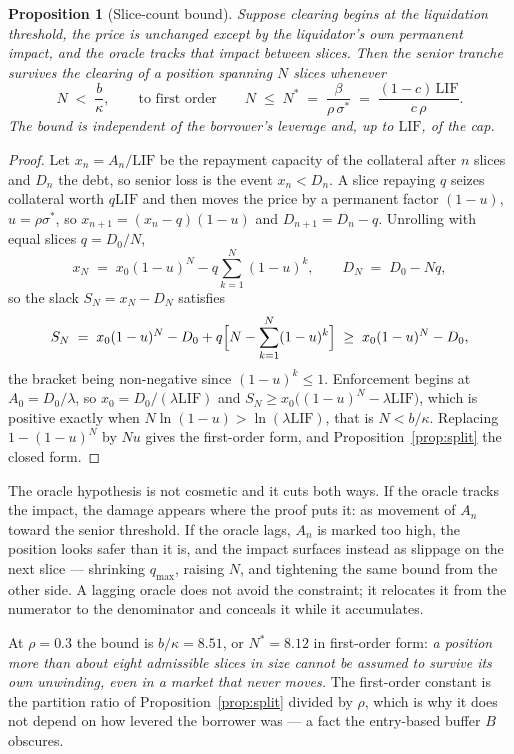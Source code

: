 \documentclass[11pt,a4paper]{article}
\theoremstyle{plain}
\newtheorem{proposition}{Proposition}
\theoremstyle{definition}
\theoremstyle{remark}
\newcommand{\LIF}{\mathrm{LIF}}
\begin{document}
\begin{proposition}[Slice-count bound]\label{prop:self}
Suppose clearing begins at the liquidation threshold, the price is unchanged except by the
liquidator's own permanent impact, and the oracle tracks that impact between slices. Then the
senior tranche survives the clearing of a position spanning $N$ slices whenever
\[
  N \;<\; \frac{b}{\kappa}, \qquad\text{to first order}\qquad
  N \;\leq\; N^{*} \;=\; \frac{\beta}{\rho\,\sigma^{*}} \;=\; \frac{(1-c)\,\LIF}{c\,\rho}.
\]
The bound is independent of the borrower's leverage and, up to $\LIF$, of the cap.
\end{proposition}

\begin{proof}
Let $x_n = A_n/\LIF$ be the repayment capacity of the collateral after $n$ slices and $D_n$ the
debt, so senior loss is the event $x_n < D_n$. A slice repaying $q$ seizes collateral worth
$q\LIF$ and then moves the price by a permanent factor $(1-u)$, $u=\rho\sigma^{*}$, so
$x_{n+1} = (x_n-q)(1-u)$ and $D_{n+1}=D_n-q$. Unrolling with equal slices $q=D_0/N$,
\[
  x_N \;=\; x_0(1-u)^N - q\sum_{k=1}^{N}(1-u)^k, \qquad D_N \;=\; D_0-Nq,
\]
so the slack $S_N = x_N-D_N$ satisfies
\[
  S_N \;=\; x_0(1-u)^N - D_0 + q\Bigl[N-\sum_{k=1}^{N}(1-u)^k\Bigr] \;\geq\; x_0(1-u)^N - D_0,
\]
the bracket being non-negative since $(1-u)^k\leq1$. Enforcement begins at $A_0=D_0/\lambda$, so
$x_0 = D_0/(\lambda\LIF)$ and $S_N \geq x_0\bigl((1-u)^N-\lambda\LIF\bigr)$, which is positive
exactly when $N\ln(1-u) > \ln(\lambda\LIF)$, that is $N<b/\kappa$. Replacing $1-(1-u)^N$ by $Nu$
gives the first-order form, and Proposition~\ref{prop:split} the closed form.
\end{proof}

The oracle hypothesis is not cosmetic and it cuts both ways. If the oracle tracks the impact, the
damage appears where the proof puts it: as movement of $A_n$ toward the senior threshold. If the
oracle lags, $A_n$ is marked too high, the position looks safer than it is, and the impact
surfaces instead as slippage on the next slice --- shrinking $q_{\max}$, raising $N$, and
tightening the same bound from the other side. A lagging oracle does not avoid the constraint; it
relocates it from the numerator to the denominator and conceals it while it accumulates.

At $\rho=0.3$ the bound is $b/\kappa=8.51$, or $N^{*}=8.12$ in first-order form: \emph{a position
more than about eight admissible slices in size cannot be assumed to survive its own unwinding,
even in a market that never moves.} The first-order constant is the partition ratio of
Proposition~\ref{prop:split} divided by $\rho$, which is why it does not depend on how levered the
borrower was --- a fact the entry-based buffer $B$ obscures.
\end{document}
